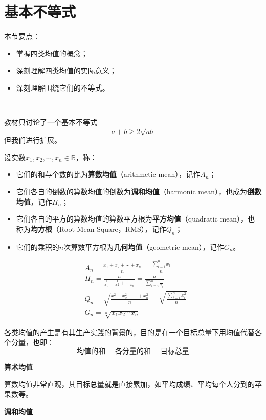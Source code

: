 \section{基本不等式}

本节要点：
\begin{itemize}
    \item 掌握四类均值的概念；
    \item 深刻理解四类均值的实际意义；
    \item 深刻理解围绕它们的不等式。
\end{itemize}

~

教材只讨论了一个基本不等式
\[
a+b\geqslant 2\sqrt{ab}
\]
但我们进行扩展。

\begin{definition}
设实数$x_1,x_2,\cdots ,x_n\in \mathbb{R} $，称：
\begin{itemize}
    \item 它们的和与个数的比为{\bf 算数均值}（arithmetic mean），记作$A_n$；
    \item 它们各自的倒数的算数均值的倒数为{\bf 调和均值}（harmonic mean），也成为{\bf 倒数均值}，记作$H_n$；
    \item 它们各自的平方的算数均值的算数平方根为{\bf 平方均值}（quadratic mean），也称为{\bf 均方根}（Root Mean Square，RMS），记作$Q_n$；
    \item 它们的乘积的$n$次算数平方根为{\bf 几何均值}（geometric mean），记作$G_n$。
\end{itemize}
\begin{align*}
&A_n=\frac{x_1+x_2+\cdots +x_n}{n}=\frac{\sum_{i=i}^n{x_i}}{n} \\
&H_n=\frac{n}{\frac{1}{x_1}+\frac{1}{x2}+\cdots \frac{1}{x_n}}=\frac{n}{\sum_{i=i}^n{\frac{1}{x_i}}} \\
&Q_n=\sqrt{\frac{x_{1}^{2}+x_{2}^{2}+\cdots +x_{n}^{2}}{n}}=\sqrt{\frac{\sum_{i=i}^n{x_{i}^{2}}}{n}} \\
&G_n=\sqrt[n]{x_1x_2\cdots x_n}
\end{align*}
\end{definition}

各类均值的产生是有其生产实践的背景的，目的是在一个目标总量下用均值代替各个分量，也即：
\[
\text{均值的和}=\text{各分量的和}=\text{目标总量}
\]

{\bf 算术均值}

算数均值非常直观，其目标总量就是直接累加，如平均成绩、平均每个人分到的苹果数等。

{\bf 调和均值}

